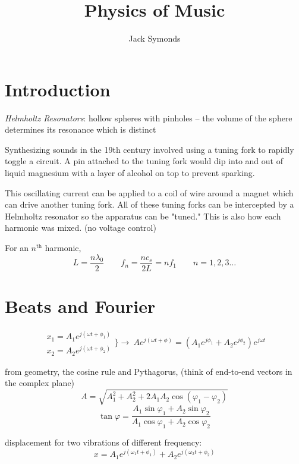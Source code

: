 \documentclass[10pt, a4paper, twocolumn]{article}
\author{Jack Symonds}
\title{Physics of Music}
\date{}
\newcommand{\deff}[1]{\par \noindent \textit{#1}: }
\newcommand{\arr}{\ensuremath{\longrightarrow\ }}
\begin{document}
\maketitle

\section{Introduction}

\deff{Helmholtz Resonators}
hollow spheres with pinholes -- the volume of the sphere determines its resonance which is distinct

Synthesizing sounds in the 19th century involved using a tuning fork to rapidly toggle a circuit. A pin attached to the tuning fork would dip into and out of liquid magnesium with a layer of alcohol on top to prevent sparking.

This oscillating current can be applied to a coil of wire around a magnet which can drive another tuning fork. All of these tuning forks can be intercepted by a Helmholtz resonator so the apparatus can be "tuned." This is also how each harmonic was mixed. (no voltage control)

For an $n^{\text{th}}$ harmonic,
\begin{equation*}
	L = \frac{n \lambda _0}{2}
	\qquad f_n = \frac{nc_s}{2L} = nf_1
	\qquad n = 1,2,3 \dots
\end{equation*}

\section{Beats and Fourier}

\begin{equation*}
\begin{matrix}
	x _1 = A_1 e^{j (\omega t + \phi _1)}
	\\ x _2 = A_2 e^{j (\omega t + \phi _2)}
\end{matrix}
\bigg\} \arr A e^{j(\omega t + \phi)}
= \left( A_1 e ^{j \phi _1}
+ A_2 e^{j \phi _2} \right) e^{j \omega t}
\end{equation*}

from geometry, the cosine rule and Pythagorus, (think of end-to-end vectors in the complex plane)
\[
A = \sqrt{A_1 ^2 + A_2 ^2
+ 2 A_1 A_2 \cos ( \varphi _1 - \varphi _2)}
\]
\[ \tan \varphi = \frac{A_1 \sin \varphi _1
+ A_2 \sin \varphi _2}{A_1 \cos \varphi _1 + A_2 \cos \varphi _2}
\]

displacement for two vibrations of different frequency:
\[ x = A_1 e^{j(\omega _1 t + \phi _1)}
+ A_2 e^{j(\omega _2 t + \phi _2)} \]
\end{document}
